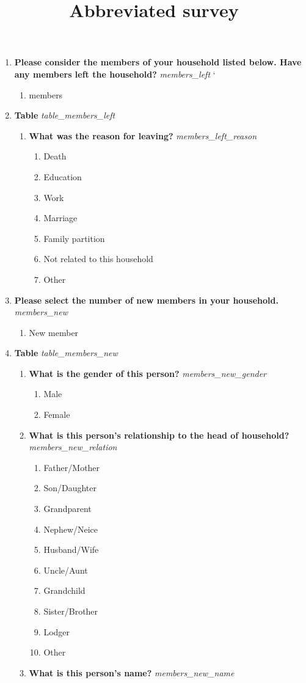\documentclass{article}
\begin{document}
 
\title{Abbreviated survey} 
 \maketitle
\begin{enumerate} 
\item {\bfseries Please consider the members of your household listed below. Have any members left the household?}\emph{ members\_left }` 
\begin{enumerate} 
\item members 
\end{enumerate} 
\item {\bfseries Table}\emph{ table\_members\_left } 
\begin{enumerate}[label*=\arabic*.] 
\item {\bfseries What was the reason for leaving?}\emph{ members\_left\_reason } 
\begin{enumerate} 
\item Death 
\item Education 
\item Work 
\item Marriage 
\item Family partition 
\item Not related to this household 
\item Other 
\end{enumerate} 
\end{enumerate} 
\item {\bfseries Please select the number of new members in your household.}\emph{ members\_new } 
\begin{enumerate} 
\item New member 
\end{enumerate} 
\item {\bfseries Table}\emph{ table\_members\_new } 
\begin{enumerate}[label*=\arabic*.] 
\item {\bfseries What is the gender of this person?}\emph{ members\_new\_gender } 
\begin{enumerate} 
\item Male 
\item Female 
\end{enumerate} 
\item {\bfseries What is this person's relationship to the head of household?}\emph{ members\_new\_relation } 
\begin{enumerate} 
\item Father/Mother 
\item Son/Daughter 
\item Grandparent 
\item Nephew/Neice 
\item Husband/Wife 
\item Uncle/Aunt 
\item Grandchild 
\item Sister/Brother 
\item Lodger 
\item Other 
\end{enumerate} 
\item {\bfseries What is this person's name?}\emph{ members\_new\_name } 
 

\end{enumerate}
\end{enumerate}
\end{document}
